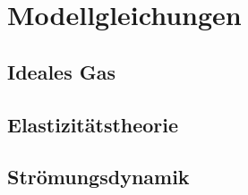 %
%
%
\chapter{Modellgleichungen%
\label{skript:chapter:modellgleichungen}}
\rhead{}
\section{Ideales Gas}

\section{Elastizitätstheorie}

\section{Strömungsdynamik}

